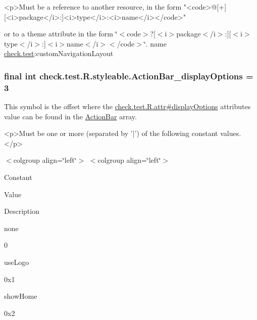 \begin{DoxyVerb}      <p>Must be a reference to another resource, in the form "<code>@[+][<i>package</i>:]<i>type</i>:<i>name</i></code>"
\end{DoxyVerb}
 or to a theme attribute in the form \char`\"{}$<$code$>$?\mbox{[}$<$i$>$package$<$/i$>$\+:\mbox{]}\mbox{[}$<$i$>$type$<$/i$>$\+:\mbox{]}$<$i$>$name$<$/i$>$$<$/code$>$\char`\"{}.  name \hyperlink{namespacecheck_1_1test}{check.\+test}\+:custom\+Navigation\+Layout \hypertarget{classcheck_1_1test_1_1_r_1_1styleable_a24df28f3ee73a49d2b813abaabda3b5b}{}
\subsubsection[{Action\+Bar\+\_\+display\+Options}]{\setlength{\rightskip}{0pt plus 5cm}final int check.\+test.\+R.\+styleable.\+Action\+Bar\+\_\+display\+Options = 3\hspace{0.3cm}{\ttfamily [static]}}\label{classcheck_1_1test_1_1_r_1_1styleable_a24df28f3ee73a49d2b813abaabda3b5b}
This symbol is the offset where the \hyperlink{classcheck_1_1test_1_1_r_1_1attr_ab08eeb4f7b4fc4c6f2ef651396d41d99}{check.\+test.\+R.\+attr\#display\+Options} attribute\textquotesingle{}s value can be found in the \hyperlink{classcheck_1_1test_1_1_r_1_1styleable_ad0a4d403cb244ea4d22c6f6ebf2c2cdf}{Action\+Bar} array.

\begin{DoxyVerb}      <p>Must be one or more (separated by '|') of the following constant values.</p>
\end{DoxyVerb}
 \begin{TabularC}{0}
\hline
\end{TabularC}
$<$colgroup align=\char`\"{}left\char`\"{}$>$ $<$colgroup align=\char`\"{}left\char`\"{}$>$ 

Constant

Value

Description 

{\ttfamily none}

0

{\ttfamily use\+Logo}

0x1

{\ttfamily show\+Home}

0x2

